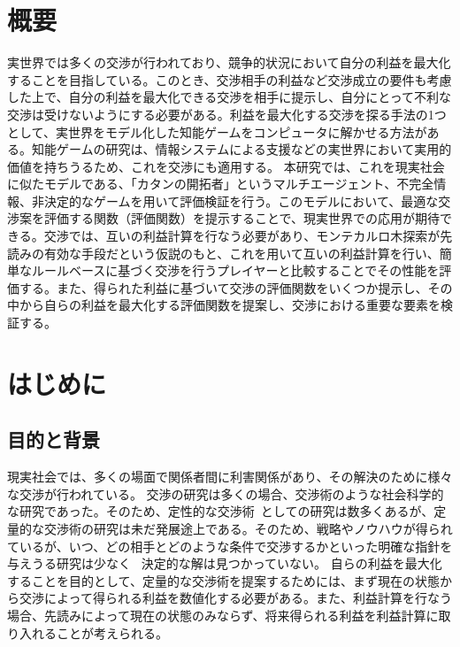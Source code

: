 \documentclass[a4, 10pt,dvipdfmx]{jsarticle}
\begin{document}
\makecover


\tableofcontents

\newpage


\section*{概要} 

実世界では多くの交渉が行われており、競争的状況において自分の利益を最大化することを目指している。このとき、交渉相手の利益など交渉成立の要件も考慮した上で、自分の利益を最大化できる交渉を相手に提示し、自分にとって不利な交渉は受けないようにする必要がある。利益を最大化する交渉を探る手法の1つとして、実世界をモデル化した知能ゲームをコンピュータに解かせる方法がある。知能ゲームの研究は、情報システムによる支援などの実世界において実用的価値を持ちうるため、これを交渉にも適用する。
本研究では、これを現実社会に似たモデルである、「カタンの開拓者」というマルチエージェント、不完全情報、非決定的なゲームを用いて評価検証を行う。このモデルにおいて、最適な交渉案を評価する関数（評価関数）を提示することで、現実世界での応用が期待できる。交渉では、互いの利益計算を行なう必要があり、モンテカルロ木探索が先読みの有効な手段だという仮説のもと、これを用いて互いの利益計算を行い、簡単なルールベースに基づく交渉を行うプレイヤーと比較することでその性能を評価する。また、得られた利益に基づいて交渉の評価関数をいくつか提示し、その中から自らの利益を最大化する評価関数を提案し、交渉における重要な要素を検証する。


\section{はじめに}

\subsection{目的と背景}

現実社会では、多くの場面で関係者間に利害関係があり、その解決のために様々な交渉が行われている。
交渉の研究は多くの場合、交渉術のような社会科学的な研究であった。そのため、定性的な交渉術~\cite{fisher2011,lewicki2001essentials,岡紀子2002視点}としての研究は数多くあるが、定量的な交渉術の研究は未だ発展途上である。そのため、戦略やノウハウが得られているが、いつ、どの相手とどのような条件で交渉するかといった明確な指針を与えうる研究は少なく ~\cite{安村禎明2002モノポリーゲームにおける交渉エージェント}決定的な解は見つかっていない。
自らの利益を最大化することを目的として、定量的な交渉術を提案するためには、まず現在の状態から交渉によって得られる利益を数値化する必要がある。また、利益計算を行なう場合、先読みによって現在の状態のみならず、将来得られる利益を利益計算に取り入れることが考えられる。  
\end{document}
